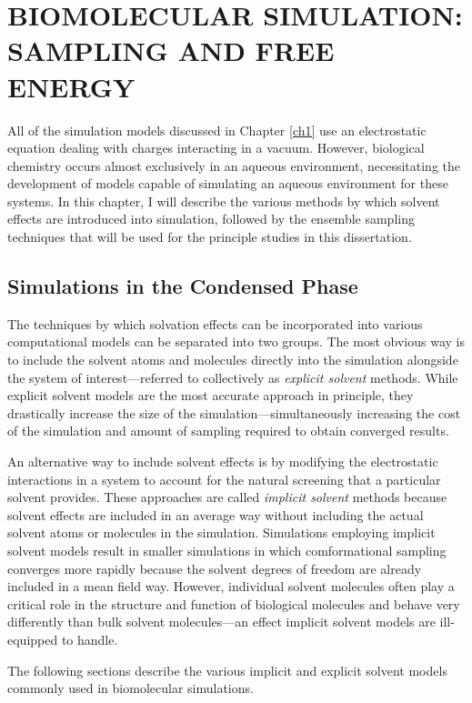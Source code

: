 \chapter{BIOMOLECULAR SIMULATION: SAMPLING AND FREE ENERGY}

All of the simulation models discussed in Chapter \ref{ch1} use an electrostatic
equation dealing with charges interacting in a vacuum. However, biological
chemistry occurs almost exclusively in an aqueous environment, necessitating the
development of models capable of simulating an aqueous environment for these
systems. In this chapter, I will describe the various methods by which solvent
effects are introduced into simulation, followed by the ensemble sampling
techniques that will be used for the principle studies in this dissertation.

\section{Simulations in the Condensed Phase}

The techniques by which solvation effects can be incorporated into various
computational models can be separated into two groups. The most obvious way is
to include the solvent atoms and molecules directly into the simulation
alongside the system of interest---referred to collectively as \emph{explicit
solvent} methods. While explicit solvent models are the most accurate approach
in principle, they drastically increase the size of the
simulation---simultaneously increasing the cost of the simulation and amount of
sampling required to obtain converged results.

An alternative way to include solvent effects is by modifying the electrostatic
interactions in a system to account for the natural screening that a particular
solvent provides. These approaches are called \emph{implicit solvent} methods
because solvent effects are included in an average way without including the
actual solvent atoms or molecules in the simulation. Simulations employing
implicit solvent models result in smaller simulations in which comformational
sampling converges more rapidly because the solvent degrees of freedom are
already included in a mean field way. However, individual solvent molecules
often play a critical role in the structure and function of biological molecules
and behave very differently than bulk solvent molecules---an effect implicit
solvent models are ill-equipped to handle.

The following sections describe the various implicit and explicit solvent models
commonly used in biomolecular simulations.

